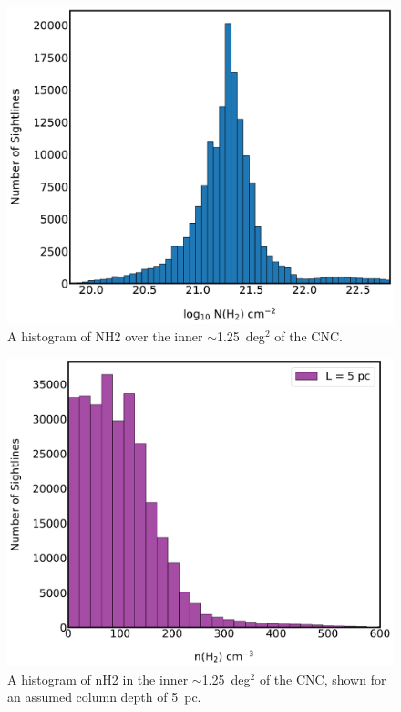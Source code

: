 \begin{figure}[!htbp]
\centering
\includegraphics[width=\textwidth]{figures/carina/NH2_hist_500}
\caption[A histogram of  over the inner  of the CNC.]{A histogram of \gls{NH2} over the inner $\sim$1.25~deg$^{2}$ of the CNC.}
\label{fig:NH2_hist}
\end{figure}

\begin{figure}[!htbp]
\centering
\includegraphics[width=\textwidth]{figures/carina/nH2_hist_500}
\caption[A histogram of  in the inner  of the CNC.]{A histogram of \gls{nH2} in the inner $\sim$1.25~deg$^{2}$ of the CNC, shown for an assumed column depth of 5~pc.}
\label{fig:nH2_hist}
\end{figure}

